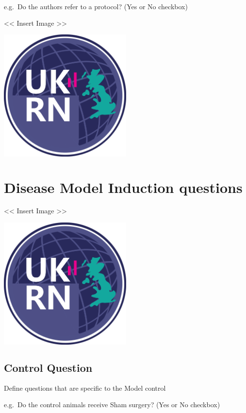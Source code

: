 \documentclass[
]{book}
\begin{document}
e.g.~Do the authors refer to a protocol?
(Yes or No checkbox)

\textless{}\textless{} Insert Image \textgreater{}\textgreater{}

\includegraphics[width=0.5\textwidth,height=0.5\textheight]{figs/evidence-triangle.png}

\hypertarget{disease-model-induction-questions}{%
\section{Disease Model Induction questions}\label{disease-model-induction-questions}}

\textless{}\textless{} Insert Image \textgreater{}\textgreater{}

\includegraphics[width=0.5\textwidth,height=0.5\textheight]{figs/evidence-triangle.png}

\hypertarget{control-question}{%
\subsection{Control Question}\label{control-question}}

Define questions that are specific to the Model control

e.g.~Do the control animals receive Sham surgery?
(Yes or No checkbox)
\end{document}
